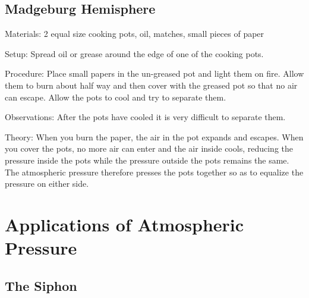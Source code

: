 \begin{multicols}{2}
\subsection{Madgeburg Hemisphere}


\begin{description*}
\item[Materials:]{2 equal size cooking pots, oil, matches, small pieces of paper}
\item[Setup:]{Spread oil or grease around the edge of one of the cooking pots.}
\item[Procedure:]{Place small papers in the un-greased pot and light them on fire. Allow them to burn about half way and then cover with the greased pot so that no air can escape. Allow the pots to cool and try to separate them.}
\item[Observations:]{After the pots have cooled it is very difficult to separate them.}
\item[Theory:]{When you burn the paper, the air in the pot expands and escapes. When you cover the pots, no more air can enter and the air inside cools, reducing the pressure inside the pots while the pressure outside the pots remains the same. The atmospheric pressure therefore presses the pots together so as to equalize the pressure on either side. }
\end{description*}

\columnbreak


\section*{Applications of Atmospheric Pressure}


\subsection{The Siphon}


\end{multicols}
